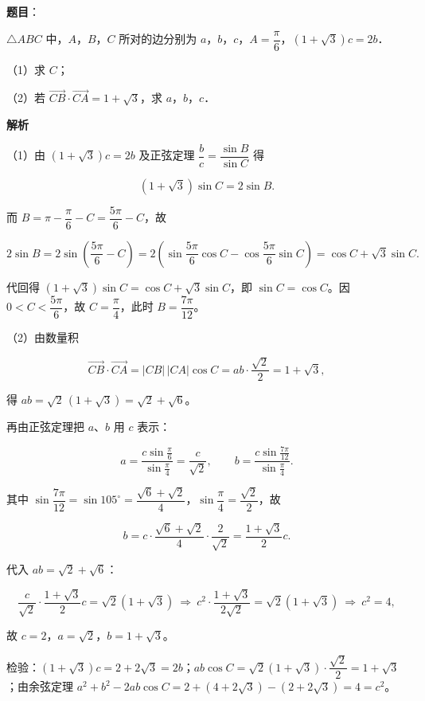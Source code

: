 \begin{answer}

\textbf{题目}：

$\triangle ABC$ 中，$A$，$B$，$C$ 所对的边分别为 $a$，$b$，$c$，$A=\dfrac{\pi}{6}$，$(1+\sqrt3)c=2b$．

（1）求 $C$；

（2）若 $\overrightarrow{CB}\cdot\overrightarrow{CA}=1+\sqrt3$，求 $a$，$b$，$c$．

\textbf{解析}

（1）由 $(1+\sqrt3)c=2b$ 及正弦定理 $\dfrac{b}{c}=\dfrac{\sin B}{\sin C}$ 得

\nopagebreak[4]
\[(1+\sqrt3)\sin C=2\sin B.\]

而 $B=\pi-\dfrac{\pi}{6}-C=\dfrac{5\pi}{6}-C$，故

\nopagebreak[4]
\[2\sin B=2\sin\left(\frac{5\pi}{6}-C\right)=2\left(\sin\frac{5\pi}{6}\cos C-\cos\frac{5\pi}{6}\sin C\right)=\cos C+\sqrt3\sin C.\]

代回得 $(1+\sqrt3)\sin C=\cos C+\sqrt3\sin C$，即 $\sin C=\cos C$。因 $0<C<\dfrac{5\pi}{6}$，故 $C=\dfrac{\pi}{4}$，此时 $B=\dfrac{7\pi}{12}$。

（2）由数量积

\nopagebreak[4]
\[\overrightarrow{CB}\cdot\overrightarrow{CA}=|CB|\,|CA|\cos C=ab\cdot\frac{\sqrt2}{2}=1+\sqrt3,\]

得 $ab=\sqrt2\,(1+\sqrt3)=\sqrt2+\sqrt6$。

再由正弦定理把 $a$、$b$ 用 $c$ 表示：

\nopagebreak[4]
\[a=\frac{c\sin\frac{\pi}{6}}{\sin\frac{\pi}{4}}=\frac{c}{\sqrt2},\qquad b=\frac{c\sin\frac{7\pi}{12}}{\sin\frac{\pi}{4}}.\]

其中 $\sin\dfrac{7\pi}{12}=\sin105^\circ=\dfrac{\sqrt6+\sqrt2}{4}$，$\sin\dfrac{\pi}{4}=\dfrac{\sqrt2}{2}$，故

\nopagebreak[4]
\[b=c\cdot\frac{\sqrt6+\sqrt2}{4}\cdot\frac{2}{\sqrt2}=\frac{1+\sqrt3}{2}c.\]

代入 $ab=\sqrt2+\sqrt6$：

\nopagebreak[4]
\[\frac{c}{\sqrt2}\cdot\frac{1+\sqrt3}{2}c=\sqrt2(1+\sqrt3)\ \Longrightarrow\ c^2\cdot\frac{1+\sqrt3}{2\sqrt2}=\sqrt2(1+\sqrt3)\ \Longrightarrow\ c^2=4,\]

故 $c=2$，$a=\sqrt2$，$b=1+\sqrt3$。

检验：$(1+\sqrt3)c=2+2\sqrt3=2b$；$ab\cos C=\sqrt2(1+\sqrt3)\cdot\dfrac{\sqrt2}{2}=1+\sqrt3$；由余弦定理 $a^2+b^2-2ab\cos C=2+(4+2\sqrt3)-(2+2\sqrt3)=4=c^2$。


\end{answer}
